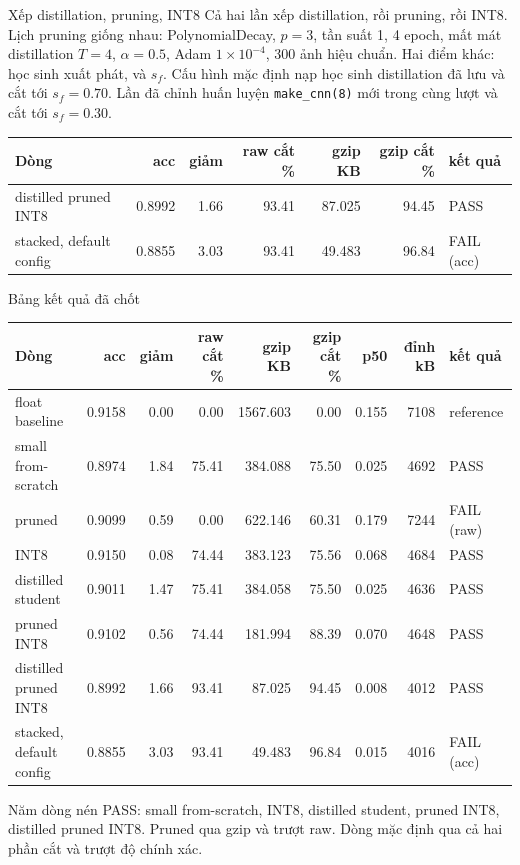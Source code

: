 \documentclass[aspectratio=169,11pt]{beamer}
\begin{document}
\begin{frame}{Xếp distillation, pruning, INT8}
  Cả hai lần xếp distillation, rồi pruning, rồi INT8.
  Lịch pruning giống nhau: PolynomialDecay, \(p=3\), tần suất 1, 4 epoch, mất mát distillation \(T=4\), \(\alpha=0.5\), Adam \(1\times 10^{-4}\), 300 ảnh hiệu chuẩn.
  \vspace{0.25em}
  Hai điểm khác: học sinh xuất phát, và \(s_f\).
  Cấu hình mặc định nạp học sinh distillation đã lưu và cắt tới \(s_f=0.70\).
  Lần đã chỉnh huấn luyện \texttt{make\_cnn(8)} mới trong cùng lượt và cắt tới \(s_f=0.30\).
  \vspace{0.7em}
  \centering
  \scriptsize
  \setlength{\tabcolsep}{4pt}
  \begin{tabular}{lrrrrrl}
    \toprule
    Dòng & acc & giảm & raw cắt \% & gzip KB & gzip cắt \% & kết quả \\
    \midrule
    distilled pruned INT8 & 0.8992 & 1.66 & 93.41 & 87.025 & 94.45 & PASS \\
    stacked, default config & 0.8855 & 3.03 & 93.41 & 49.483 & 96.84 & FAIL (acc) \\
    \bottomrule
  \end{tabular}
\end{frame}

\begin{frame}{Bảng kết quả đã chốt}
  \begin{center}
  \scriptsize
  \setlength{\tabcolsep}{2.4pt}
  \begin{tabular}{lrrrrrrrl}
    \toprule
    Dòng & acc & giảm & raw cắt \% & gzip KB & gzip cắt \% & p50 & đỉnh kB & kết quả \\
    \midrule
    float baseline & 0.9158 & 0.00 & 0.00 & 1567.603 & 0.00 & 0.155 & 7108 & reference \\
    small from-scratch & 0.8974 & 1.84 & 75.41 & 384.088 & 75.50 & 0.025 & 4692 & PASS \\
    pruned & 0.9099 & 0.59 & 0.00 & 622.146 & 60.31 & 0.179 & 7244 & FAIL (raw) \\
    INT8 & 0.9150 & 0.08 & 74.44 & 383.123 & 75.56 & 0.068 & 4684 & PASS \\
    distilled student & 0.9011 & 1.47 & 75.41 & 384.058 & 75.50 & 0.025 & 4636 & PASS \\
    pruned INT8 & 0.9102 & 0.56 & 74.44 & 181.994 & 88.39 & 0.070 & 4648 & PASS \\
    distilled pruned INT8 & 0.8992 & 1.66 & 93.41 & 87.025 & 94.45 & 0.008 & 4012 & PASS \\
    stacked, default config & 0.8855 & 3.03 & 93.41 & 49.483 & 96.84 & 0.015 & 4016 & FAIL (acc) \\
    \bottomrule
  \end{tabular}
  \end{center}
  \vspace{0.2em}
  Năm dòng nén PASS: small from-scratch, INT8, distilled student, pruned INT8, distilled pruned INT8.
  Pruned qua gzip và trượt raw. Dòng mặc định qua cả hai phần cắt và trượt độ chính xác.
\end{frame}
\end{document}
